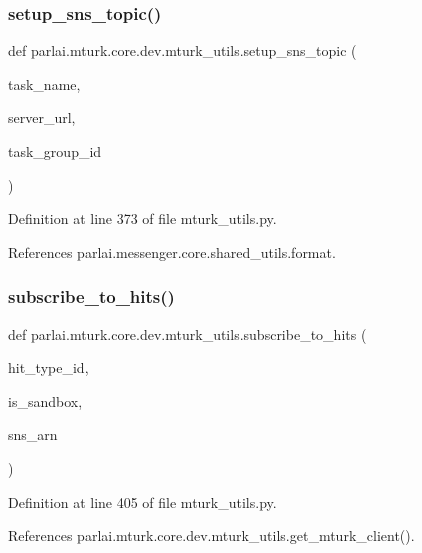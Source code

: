 \subsubsection{\texorpdfstring{setup\+\_\+sns\+\_\+topic()}{setup\_sns\_topic()}}
{\footnotesize\ttfamily def parlai.\+mturk.\+core.\+dev.\+mturk\+\_\+utils.\+setup\+\_\+sns\+\_\+topic (\begin{DoxyParamCaption}\item[{}]{task\+\_\+name,  }\item[{}]{server\+\_\+url,  }\item[{}]{task\+\_\+group\+\_\+id }\end{DoxyParamCaption})}



Definition at line 373 of file mturk\+\_\+utils.\+py.



References parlai.\+messenger.\+core.\+shared\+\_\+utils.\+format.

\mbox{\label{namespaceparlai_1_1mturk_1_1core_1_1dev_1_1mturk__utils_a06d86a6c70c953fda4ae13db4d43bc79}} 
\subsubsection{\texorpdfstring{subscribe\+\_\+to\+\_\+hits()}{subscribe\_to\_hits()}}
{\footnotesize\ttfamily def parlai.\+mturk.\+core.\+dev.\+mturk\+\_\+utils.\+subscribe\+\_\+to\+\_\+hits (\begin{DoxyParamCaption}\item[{}]{hit\+\_\+type\+\_\+id,  }\item[{}]{is\+\_\+sandbox,  }\item[{}]{sns\+\_\+arn }\end{DoxyParamCaption})}



Definition at line 405 of file mturk\+\_\+utils.\+py.



References parlai.\+mturk.\+core.\+dev.\+mturk\+\_\+utils.\+get\+\_\+mturk\+\_\+client().

